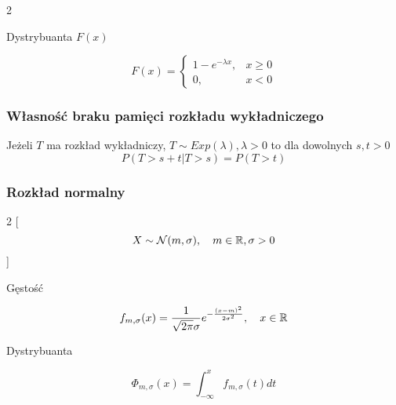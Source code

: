 \documentclass[../Matematyka.tex]{subfiles}
\begin{document}
\begin{multicols}{2}
    \begin{center}
        Dystrybuanta \(F(x)\)
    \end{center}

    \[
        F(x) =
        \begin{cases}
            1 - e^{-\lambda x}, & x \geq 0 \\
            0,                  & x < 0
        \end{cases}
    \]
\end{multicols}
\subsubsection*{Własność braku pamięci rozkładu wykładniczego}
Jeżeli \(T\) ma rozkład wykładniczy, \(T \sim Exp(\lambda), \lambda > 0\) to dla dowolnych \(s, t > 0\)
\[P(T > s+t | T > s) = P(T > t)\]

\newpage
\subsubsection{Rozkład normalny}
\begin{multicols}{2}
    [\[X \sim \mathcal{N} (m, \sigma), \quad m \in \mathbb{R}, \sigma > 0\]]
    \begin{center}
        Gęstość
    \end{center}
    \[f_{m,\sigma}(x) = \frac{1}{\sqrt{2\pi} \sigma}e^{-\frac{(x-m)^2}{2\sigma^2}}, \quad x \in \mathbb{R}\]

    \begin{center}
        Dystrybuanta
    \end{center}
    \[\Phi_{m,\sigma}(x) = \int_{-\infty}^{x}f_{m,\sigma}(t)dt\]
\end{multicols}
\end{document}
